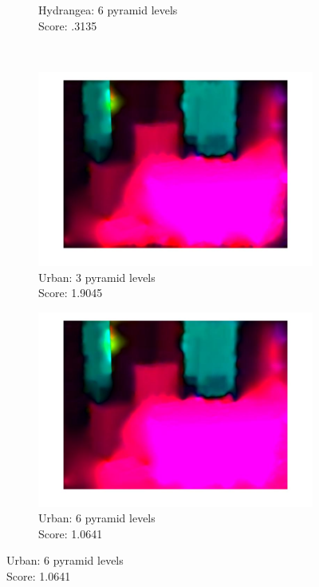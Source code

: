 \documentclass[10pt,twocolumn,letterpaper]{article}
\begin{document}
\begin{figure}[t]
\begin{subfigure}[b]{0.3\textwidth}
		\caption{Hydrangea: 6 pyramid levels \\ Score: .3135 }
		\label{fig:hydrangea6}
	\end{subfigure} \\
	\begin{subfigure}[b]{0.3\textwidth}
		\centering
        \includegraphics[width=\textwidth] {urban2_3levels.jpg}
        \caption{Urban: 3 pyramid levels \\ Score: 1.9045}
		\label{fig:urban3}
    \end{subfigure}\hfill
    \begin{subfigure}[b]{0.3\textwidth}
		\centering
        \includegraphics[width=\textwidth] {urban2_5levels.jpg}
        \caption{Urban: 6 pyramid levels \\ Score: 1.0641}
        \label{fig:urban6}

\end{subfigure}
\end{figure}
\end{document}
